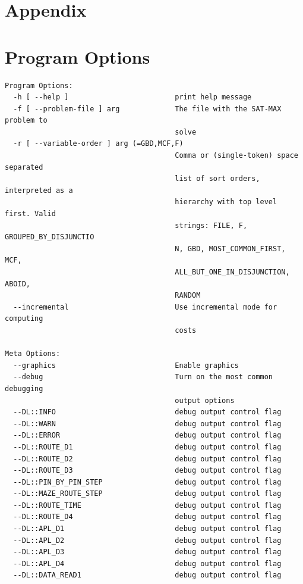 \documentclass[10pt]{article}
\begin{document}
\section*{Appendix}
\appendix
\begin{minipage}{\linewidth}
\section{Program Options}\label{sec:program-args}
\begin{lstlisting}
Program Options:
  -h [ --help ]                         print help message
  -f [ --problem-file ] arg             The file with the SAT-MAX problem to 
                                        solve
  -r [ --variable-order ] arg (=GBD,MCF,F)
                                        Comma or (single-token) space separated
                                        list of sort orders, interpreted as a 
                                        hierarchy with top level first. Valid 
                                        strings: FILE, F, GROUPED_BY_DISJUNCTIO
                                        N, GBD, MOST_COMMON_FIRST, MCF, 
                                        ALL_BUT_ONE_IN_DISJUNCTION, ABOID, 
                                        RANDOM
  --incremental                         Use incremental mode for computing 
                                        costs

Meta Options:
  --graphics                            Enable graphics
  --debug                               Turn on the most common debugging 
                                        output options
  --DL::INFO                            debug output control flag
  --DL::WARN                            debug output control flag
  --DL::ERROR                           debug output control flag
  --DL::ROUTE_D1                        debug output control flag
  --DL::ROUTE_D2                        debug output control flag
  --DL::ROUTE_D3                        debug output control flag
  --DL::PIN_BY_PIN_STEP                 debug output control flag
  --DL::MAZE_ROUTE_STEP                 debug output control flag
  --DL::ROUTE_TIME                      debug output control flag
  --DL::ROUTE_D4                        debug output control flag
  --DL::APL_D1                          debug output control flag
  --DL::APL_D2                          debug output control flag
  --DL::APL_D3                          debug output control flag
  --DL::APL_D4                          debug output control flag
  --DL::DATA_READ1                      debug output control flag
\end{lstlisting}
\end{minipage}
\end{document}
